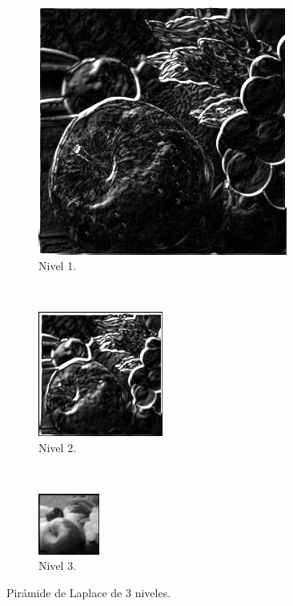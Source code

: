 \documentclass[12pt, letterpaper]{article}
\begin{document}
\begin{figure}[H]
  \centering
  \begin{subfigure}[t]{0.32\textwidth}
    \centering
    \includegraphics[width = 0.9\textwidth]{piramides/lp1.png}
    \caption{Nivel 1.}
  \end{subfigure}
  ~
  \begin{subfigure}[t]{0.32\textwidth}
      \centering
      \includegraphics[width = 0.45\textwidth]{piramides/lp2.png}
      \caption{Nivel 2.}
  \end{subfigure}
  ~ 
  \begin{subfigure}[t]{0.32\textwidth}
      \centering
      \includegraphics[width = 0.22\textwidth]{piramides/lp3.png}
      \caption{Nivel 3.}
  \end{subfigure}
  \caption{Pirámide de Laplace de 3 niveles.}
  \label{fig:lp3frutas}
\end{figure}
\end{document}
